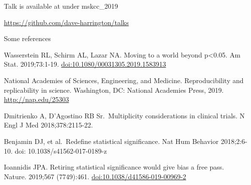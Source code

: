 \documentclass[ignorenonframetext,]{beamer}
\begin{document}
\begin{frame}

Talk is available at under mskcc\_2019

\url{https://github.com/dave-harrington/talks}

\end{frame}

\begin{frame}{Some references}
\protect\hypertarget{some-references}{}

\small

Wasserstein RL, Schirm AL, Lazar NA. Moving to a world beyond
p\textless{}0.05. Am Stat. 2019;73:1-19.
\url{doi:10.1080/00031305.2019.1583913}

National Academies of Sciences, Engineering, and Medicine.
Reproducibility and replicability in science. Washington, DC: National
Academies Press, 2019. \url{http://nap.edu/25303}

Dmitrienko A, D'Agostino RB Sr.~Multiplicity considerations in clinical
trials. N Engl J Med 2018;378:2115-22.

Benjamin DJ, et al.~Redefine statistical significance. Nat Hum Behavior
2018;2:6-10. doi: 10.1038/s41562-017-0189-z

Ioannidis JPA. Retiring statistical significance would give bias a free
pass. Nature. 2019;567 (7749):461. \url{doi:10.1038/d41586-019-00969-2}

\end{frame}
\end{document}
